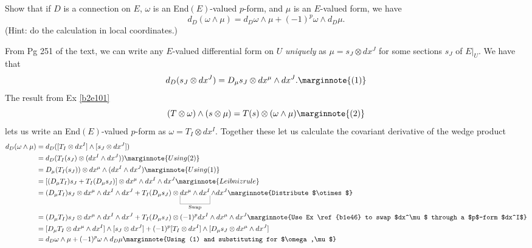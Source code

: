 \documentclass[10pt]{article}
\begin{document}
\begin{example}\label{b2e107}
	Show that if $D$ is a connection on $E$, $\omega$ is an End$(E)$-valued $p$-form, and $\mu$ is an $E$-valued form, we have
	$$
	d_D(\omega\wedge\mu) = d_D\omega\wedge\mu + (-1)^p\omega\wedge d_D\mu.
	$$
	(Hint: do the calculation in local coordinates.)
\end{example}
\sol From Pg 251 of the text, we can write any $E$-valued differential form on $U$ \emph{uniquely} as $\mu=s_J\otimes dx^J$ for some sections $s_J$ of $E|_U$. We have that
$$
d_D(s_J\otimes dx^J) = D_\mu s_J\otimes dx^\mu \wedge dx^J.\marginnote{(1)}
$$
The result from Ex \ref{b2e101}
$$
(T\otimes\omega)\wedge(s\otimes\mu)=T(s)\otimes(\omega\wedge\mu)\marginnote{(2)}
$$
lets us write an End$(E)$-valued $p$-form as $\omega=T_I\otimes dx^I$. Together these let us calculate the covariant derivative of the wedge product
$$
\begin{aligned}
	d_D(\omega\wedge\mu) &= d_D([T_I\otimes dx^I] \wedge [s_J\otimes dx^J])\\
	&= d_D(T_I(s_J) \otimes (dx^I \wedge dx^J))\marginnote{Using (2)}\\
	&= D_\mu(T_I(s_J)) \otimes dx^\mu \wedge (dx^I \wedge dx^J)\marginnote{Using (1)}\\
	&= [(D_\mu T_I)s_J+T_I(D_\mu s_J)] \otimes dx^\mu \wedge dx^I \wedge dx^J\marginnote{Leibniz rule}\\
	&= (D_\mu T_I)s_J \otimes dx^\mu \wedge dx^I \wedge dx^J + T_I(D_\mu s_J) \otimes \ub{dx^\mu \wedge dx^I}{\text{Swap}} \wedge dx^J\marginnote{Distribute $\otimes$}\\
	&= (D_\mu T_I)s_J \otimes dx^\mu \wedge dx^I \wedge dx^J + T_I(D_\mu s_J) \otimes (-1)^p dx^I \wedge dx^\mu \wedge dx^J\marginnote{Use Ex \ref{b1e46} to swap $dx^\mu$ through a $p$-form $dx^I$}\\
	&= [D_\mu T_I \otimes dx^\mu \wedge dx^I] \wedge [s_J \otimes dx^J] + (-1)^p [T_I \otimes dx^I] \wedge [D_\mu s_J \otimes dx^\mu \wedge dx^J] \\
	&= d_D\omega\wedge\mu + (-1)^p\omega\wedge d_D\mu\marginnote{Using (1) and substituting for $\omega,\mu$}
\end{aligned}
$$
\end{document}
